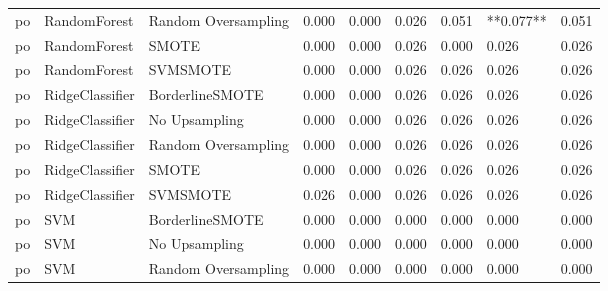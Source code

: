 \begin{tabular}{lllllllll}
      po &                 RandomForest & Random Oversampling & 0.000 &                     0.000 &                 0.026 &                  0.051 &                               **0.077** &     0.051 \\
      po &                 RandomForest &               SMOTE & 0.000 &                     0.000 &                 0.026 &                  0.000 &                                   0.026 &     0.026 \\
      po &                 RandomForest &            SVMSMOTE & 0.000 &                     0.000 &                 0.026 &                  0.026 &                                   0.026 &     0.026 \\
      po &              RidgeClassifier &     BorderlineSMOTE & 0.000 &                     0.000 &                 0.026 &                  0.026 &                                   0.026 &     0.026 \\
      po &              RidgeClassifier &       No Upsampling & 0.000 &                     0.000 &                 0.026 &                  0.026 &                                   0.026 &     0.026 \\
      po &              RidgeClassifier & Random Oversampling & 0.000 &                     0.000 &                 0.026 &                  0.026 &                                   0.026 &     0.026 \\
      po &              RidgeClassifier &               SMOTE & 0.000 &                     0.000 &                 0.026 &                  0.026 &                                   0.026 &     0.026 \\
      po &              RidgeClassifier &            SVMSMOTE & 0.026 &                     0.000 &                 0.026 &                  0.026 &                                   0.026 &     0.026 \\
      po &                          SVM &     BorderlineSMOTE & 0.000 &                     0.000 &                 0.000 &                  0.000 &                                   0.000 &     0.000 \\
      po &                          SVM &       No Upsampling & 0.000 &                     0.000 &                 0.000 &                  0.000 &                                   0.000 &     0.000 \\
      po &                          SVM & Random Oversampling & 0.000 &                     0.000 &                 0.000 &                  0.000 &                                   0.000 &     0.000 \\

\end{tabular}

